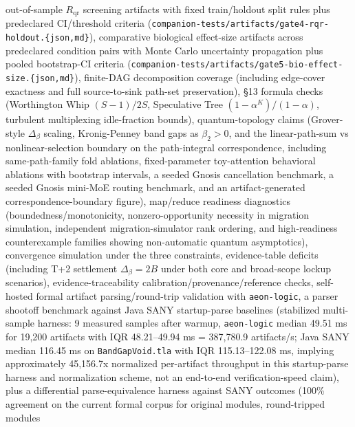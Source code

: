 \documentclass[
  11pt,
]{article}
\begin{document}
\begin{itemize}
  out-of-sample \(R_{\text{qr}}\) screening artifacts with fixed
  train/holdout split rules plus predeclared CI/threshold criteria
  (\texttt{companion-\allowbreak{}tests/\allowbreak{}artifacts/\allowbreak{}gate4-\allowbreak{}rqr-\allowbreak{}holdout.\allowbreak{}\{json,md\}}),
  comparative biological effect-size artifacts across predeclared
  condition pairs with Monte Carlo uncertainty propagation plus pooled
  bootstrap-CI criteria
  (\texttt{companion-\allowbreak{}tests/\allowbreak{}artifacts/\allowbreak{}gate5-\allowbreak{}bio-\allowbreak{}effect-\allowbreak{}size.\allowbreak{}\{json,md\}}),
  finite-DAG decomposition coverage (including edge-cover exactness and
  full source-to-sink path-set preservation), §13 formula checks
  (Worthington Whip \((S-1)/2S\), Speculative Tree
  \((1-\alpha^K)/(1-\alpha)\), turbulent multiplexing idle-fraction
  bounds), quantum-topology claims (Grover-style \(\Delta_\beta\)
  scaling, Kronig-Penney band gaps as \(\beta_2 > 0\), and the
  linear-path-sum vs nonlinear-selection boundary on the path-integral
  correspondence, including same-path-family fold ablations,
  fixed-parameter toy-attention behavioral ablations with bootstrap
  intervals, a seeded Gnosis cancellation benchmark, a seeded Gnosis
  mini-MoE routing benchmark, and an artifact-generated
  correspondence-boundary figure), map/reduce readiness diagnostics
  (boundedness/monotonicity, nonzero-opportunity necessity in migration
  simulation, independent migration-simulator rank ordering, and
  high-readiness counterexample families showing non-automatic quantum
  asymptotics), convergence simulation under the three constraints,
  evidence-table deficits (including T+2 settlement
  \(\Delta_\beta = 2B\) under both core and broad-scope lockup
  scenarios), evidence-traceability calibration/provenance/reference
  checks, self-hosted formal artifact parsing/round-trip validation with
  \texttt{aeon-logic}, a parser shootoff benchmark against Java SANY
  startup-parse baselines (stabilized multi-sample harness: 9 measured
  samples after warmup, \texttt{aeon-logic} median 49.51 ms for 19,200
  artifacts with IQR 48.21--49.94 ms = 387,780.9 artifacts/s; Java SANY
  median 116.45 ms on \texttt{BandGapVoid.tla} with IQR 115.13--122.08
  ms, implying approximately 45,156.7x normalized per-artifact
  throughput in this startup-parse harness and normalization scheme, not
  an end-to-end verification-speed claim), plus a differential
  parse-equivalence harness against SANY outcomes (100\% agreement on
  the current formal corpus for original modules, round-tripped modules

\end{itemize}
\end{document}
